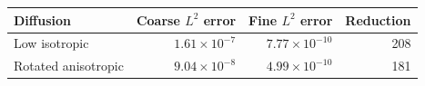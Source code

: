 \begin{tabular}{lrrr}
\toprule
Diffusion & Coarse $L^2$ error & Fine $L^2$ error & Reduction \\
\midrule
Low isotropic & $1.61\times10^{-7}$ & $7.77\times10^{-10}$ & 208 \\
Rotated anisotropic & $9.04\times10^{-8}$ & $4.99\times10^{-10}$ & 181 \\
\bottomrule
\end{tabular}
